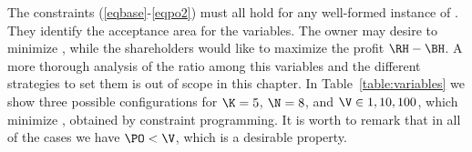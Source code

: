 The constraints (\ref{eqbase}-\ref{eqpo2}) must all hold for any well-formed instance of \shortname. 
They identify the acceptance area for the variables. 
The owner may desire to minimize \PO, while the shareholders would like to maximize the profit $\RH - \BH$.
A more thorough analysis of the ratio among this variables and the different strategies to set them is out of scope in this chapter.
In Table~\ref{table:variables} we show three possible configurations for $\K=5$, $\N=8$, and $\V \in {1, 10, 100}$, which minimize \PO, obtained by constraint programming.
It is worth to remark that in all of the cases we have $\PO < \V$, which is a desirable property.


